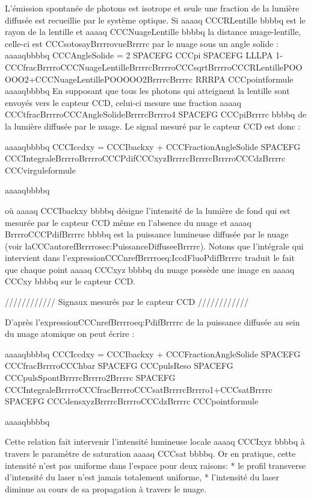 L'émission spontanée de photons est isotrope et seule une fraction de la lumière diffusée est recueillie par le système optique. Si aaaaq CCCRLentille bbbbq est le rayon de la lentille et aaaaq CCCNuageLentille bbbbq la distance nuage-lentille, celle-ci est CCCsotosayBrrrrovueBrrrrc par le nuage sous un angle solide :
aaaaqbbbbq
CCCAngleSolide = 2 SPACEFG CCCpi SPACEFG  LLLPA  1-CCCfracBrrrroCCCNuageLentilleBrrrrcBrrrroCCCsqrtBrrrroCCCRLentillePOOOOO2+CCCNuageLentillePOOOOO2BrrrrcBrrrrc  RRRPA 
CCCpointformule
aaaaqbbbbq
En supposant que tous les photons qui atteignent la lentille sont envoyés vers le capteur CCD, celui-ci mesure une fraction aaaaq CCCtfracBrrrroCCCAngleSolideBrrrrcBrrrro4 SPACEFG CCCpiBrrrrc bbbbq de la lumière diffusée par le nuage.
Le signal mesuré par le capteur CCD est donc :




aaaaqbbbbq
	CCCIccdxy 
	= CCCIbackxy + CCCFractionAngleSolide  SPACEFG  CCCIntegraleBrrrroBrrrroCCCPdifCCCxyzBrrrrcBrrrrcBrrrroCCCdzBrrrrc 
	CCCvirguleformule
	
aaaaqbbbbq


 
où aaaaq CCCIbackxy bbbbq désigne l'intensité de la lumière de fond
qui est mesurée par le capteur CCD même en l'absence du nuage et aaaaq BrrrroCCCPdifBrrrrc bbbbq est la puissance lumineuse diffusée par le nuage (voir laCCCautorefBrrrrosec:PuissanceDiffuseeBrrrrc).
Notons que l'intégrale qui intervient dans l'expressionCCCnrefBrrrroeq:IccdFluoPdifBrrrrc traduit le fait que chaque point aaaaq CCCxyz bbbbq du nuage possède une image en aaaaq CCCxy bbbbq sur le capteur CCD. 


//////////// Signaux mesurés par le capteur CCD ////////////

D'après l'expressionCCCnrefBrrrroeq:PdifBrrrrc de la puissance diffusée au sein du nuage atomique on peut écrire :



aaaaqbbbbq
	CCCIccdxy 
	=  CCCIbackxy
	  + CCCFractionAngleSolide
	 SPACEFG  CCCfracBrrrroCCChbar SPACEFG CCCpulsReso SPACEFG CCCpulsSpontBrrrrcBrrrro2Brrrrc
	 SPACEFG  CCCIntegraleBrrrroCCCfracBrrrroCCCsatBrrrrcBrrrro1+CCCsatBrrrrc  SPACEFG  CCCdensxyzBrrrrcBrrrroCCCdzBrrrrc
	CCCpointformule
	
aaaaqbbbbq


 
Cette relation fait intervenir l'intensité lumineuse locale aaaaq CCCIxyz bbbbq à travers le paramètre de saturation aaaaq CCCsat bbbbq. Or en pratique, cette intensité n'est pas uniforme dans l'espace pour deux raisons:
	* le profil transverse d'intensité du laser n'est jamais totalement uniforme,
	* l'intensité du laser diminue au cours de sa propagation à travers le nuage.

